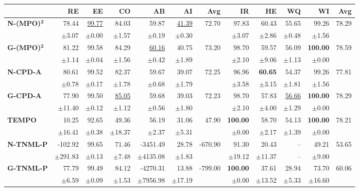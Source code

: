 \begin{table}[!htbp]
\centering
\scriptsize
\begin{tabular}{lrrrrrr||rrrrr}
\toprule
 & RE & EE & CO & AB & AI & Avg & IR & HE & WQ & WI & Avg \\
\midrule
\textbf{N-(MPO)}$\bm{^2}$ & 78.44 & \underline{99.77} & 84.03 & 59.87 & \underline{41.39} & 72.70 & 97.83 & 60.43 & 55.65 & 99.26 & 78.29 \\
 & $\pm$3.07 & $\pm$0.00 & $\pm$1.57 & $\pm$0.19 & $\pm$0.30 &  & $\pm$3.07 & $\pm$2.86 & $\pm$0.48 & $\pm$1.56 &  \\
\midrule
\textbf{G-(MPO)}$\bm{^2}$ & 81.22 & 99.58 & 84.29 & \underline{60.16} & 40.75 & 73.20 & 98.70 & 59.57 & 56.09 & \textbf{100.00} & 78.59 \\
 & $\pm$1.14 & $\pm$0.04 & $\pm$1.56 & $\pm$0.42 & $\pm$1.89 &  & $\pm$2.10 & $\pm$9.06 & $\pm$1.13 & $\pm$0.00 &  \\
\midrule
\textbf{N-CPD-A} & 80.61 & 99.52 & 82.37 & 59.67 & 39.07 & 72.25 & 96.96 & \textbf{60.65} & 54.37 & 99.26 & 77.81 \\
 & $\pm$0.78 & $\pm$0.17 & $\pm$1.78 & $\pm$0.68 & $\pm$1.79 &  & $\pm$3.58 & $\pm$3.15 & $\pm$1.81 & $\pm$1.56 &  \\
\midrule
\textbf{G-CPD-A} & 77.90 & 99.50 & \underline{85.05} & 59.68 & 39.03 & 72.23 & 98.70 & 57.83 & \underline{56.66} & \textbf{100.00} & 78.29 \\
 & $\pm$11.40 & $\pm$0.12 & $\pm$1.12 & $\pm$0.56 & $\pm$1.80 &  & $\pm$2.10 & $\pm$4.00 & $\pm$1.29 & $\pm$0.00 &  \\
\midrule
\textbf{TEMPO} & 10.25 & 92.65 & 49.36 & 56.19 & 31.06 & 47.90 & \textbf{100.00} & 58.70 & 54.13 & \textbf{100.00} & 78.21 \\
 & $\pm$16.41 & $\pm$0.38 & $\pm$18.37 & $\pm$2.37 & $\pm$5.31 &  & $\pm$0.00 & $\pm$2.17 & $\pm$1.39 & $\pm$0.00 &  \\
\midrule
\textbf{N-TNML-P} & -102.92 & 99.65 & 71.46 & -3451.49 & 28.78 & -670.90 & 91.30 & 20.43 & -- & 49.21 & 53.65 \\
 & $\pm$291.83 & $\pm$0.13 & $\pm$7.48 & $\pm$4135.08 & $\pm$1.83 &  & $\pm$19.12 & $\pm$11.37 & -- & $\pm$9.00 &  \\
\midrule
\textbf{G-TNML-P} & 77.79 & 99.49 & 84.12 & -4270.31 & 13.88 & -799.00 & \textbf{100.00} & 37.61 & 28.94 & 73.70 & 60.06 \\
 & $\pm$6.59 & $\pm$0.09 & $\pm$1.53 & $\pm$7956.98 & $\pm$17.19 &  & $\pm$0.00 & $\pm$13.52 & $\pm$5.33 & $\pm$16.60 &  \\

\end{tabular}
\end{table}
